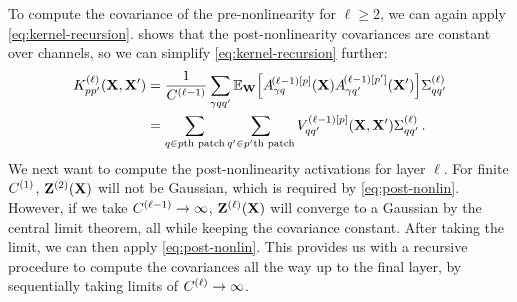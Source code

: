 \documentclass[tablecaption=bottom,wcp,nonatbib]{jmlr} %
\newcommand{\vX}{\mathbf{X}}
\newcommand{\vW}{\mathbf{W}}
\begin{document}
To compute the covariance of the pre-nonlinearity for $\ell\geq 2$, we can again apply \cref{eq:kernel-recursion}.  shows that the post-nonlinearity covariances are constant over channels, so we can simplify \cref{eq:kernel-recursion} further:
\begin{align}
    K_{pp'}^{(\ell)}(\vX, \vX') &= \frac{1}{\layerC{\ell-1}} \sum_{\gamma qq'} \Exp{\vW}{\layerNLAs{(\ell-1)[p]}{\gamma q} \layerNLAsd{(\ell-1)[p']}{\gamma q'}} \priorWcovs{\ell}_{qq'} \nonumber \\
    &= \sum_{q \in p\text{th patch}}\sum_{q'\in p'\text{th patch}} V_{qq'}^{(\ell-1)[p]}(\vX,\vX') \priorWcovs{\ell}_{qq'} \,.
\end{align}
We next want to compute the post-nonlinearity activations for layer $\ell$. For finite $C^{(1)}$, $\layerA{2}{}$ will not be Gaussian, which is required by \cref{eq:post-nonlin}. However, if we take $C^{(\ell-1)}\to\infty$, $\layerA{\ell}{}$ will converge to a Gaussian by the central limit theorem, all while keeping the covariance constant. After taking the limit, we can then apply \cref{eq:post-nonlin}. This provides us with a recursive procedure to compute the covariances all the way up to the final layer, by sequentially taking limits of $C^{(\ell)}\to\infty$. %

\end{document}

